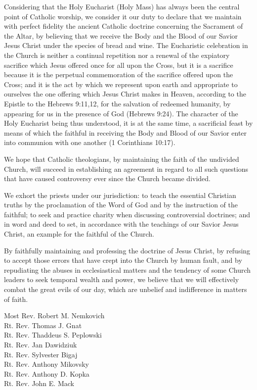 Considering that the Holy Eucharist (Holy Mass) has always been the
central point of Catholic worship, we consider it our duty to declare
that we maintain with perfect fidelity the ancient Catholic doctrine
concerning the Sacrament of the Altar, by believing that we receive the
Body and the Blood of our Savior Jesus Christ under the species of bread
and wine. The Eucharistic celebration in the Church is neither a
continual repetition nor a renewal of the expiatory sacrifice which
Jesus offered once for all upon the Cross, but it is a sacrifice because
it is the perpetual commemoration of the sacrifice offered upon the
Cross; and it is the act by which we represent upon earth and
appropriate to ourselves the one offering which Jesus Christ makes in
Heaven, according to the Epistle to the Hebrews 9:11,12, for the
salvation of redeemed humanity, by appearing for us in the presence of
God (Hebrews 9:24). The character of the Holy Eucharist being thus
understood, it is at the same time, a sacrificial feast by means of
which the faithful in receiving the Body and Blood of our Savior enter
into communion with one another (1 Corinthians 10:17).

We hope that Catholic theologians, by maintaining the faith of the
undivided Church, will succeed in establishing an agreement in regard to
all such questions that have caused controversy ever since the Church
became divided.

We exhort the priests under our jurisdiction: to teach the essential
Christian truths by the proclamation of the Word of God and by the
instruction of the faithful; to seek and practice charity when
discussing controversial doctrines; and in word and deed to set, in
accordance with the teachings of our Savior Jesus Christ, an example for
the faithful of the Church.

By faithfully maintaining and professing the doctrine of Jesus Christ,
by refusing to accept those errors that have crept into the Church by
human fault, and by repudiating the abuses in ecclesiastical matters and
the tendency of some Church leaders to seek temporal wealth and power,
we believe that we will effectively combat the great evils of our day,
which are unbelief and indifference in matters of faith.

Most Rev. Robert M. Nemkovich\\
Rt. Rev. Thomas J. Gnat\\
Rt. Rev. Thaddeus S. Peplowski\\
Rt. Rev. Jan Dawidziuk\\
Rt. Rev. Sylvester Bigaj\\
Rt. Rev. Anthony Mikovsky\\
Rt. Rev. Anthony D. Kopka\\
Rt. Rev. John E. Mack

